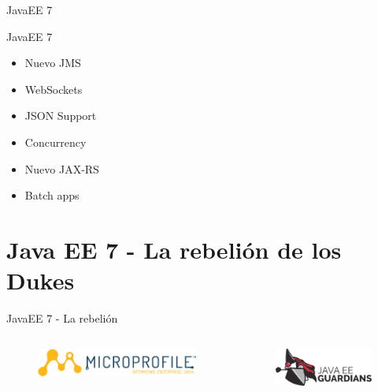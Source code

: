 \documentclass{beamer}
\begin{document}
\begin{frame}{JavaEE 7}
\begin{exampleblock}{JavaEE 7}
	\begin{itemize}
		\item Nuevo JMS
		\item WebSockets
		\item JSON Support
		\item Concurrency
		\item Nuevo JAX-RS
		\item Batch apps
	\end{itemize}
\end{exampleblock}
\end{frame}



\section{Java EE 7 - La rebelión de los Dukes}

\begin{frame}{JavaEE 7 - La rebelión}
\begin{columns}
	\begin{column}{0.5\textwidth}
		\begin{figure}
			\centering
			\includegraphics[width=\linewidth]{Images/microprofile-logo}
		\end{figure}
	\end{column}
	\begin{column}{0.5\textwidth}  %
		\begin{figure}
			\centering
			\includegraphics[width=\linewidth]{Images/guardians}
		\end{figure}
	\end{column}
\end{columns}
\end{frame}
\end{document}
